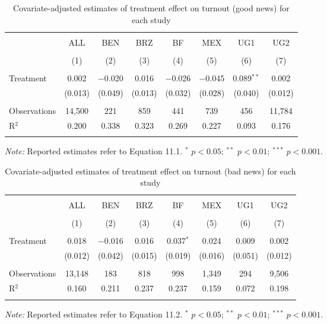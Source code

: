 \documentclass[]{article}
\begin{document}
\begin{table}[htb] \centering 
  \caption{Covariate-adjusted estimates of treatment effect on turnout (good news) for each study} 
  \label{} 
\begin{tabular}{@{\extracolsep{1pt}}lccccccc} 
\\[-1.8ex]\hline 
\hline \\[-1.8ex] 
 & ALL & BEN & BRZ & BF & MEX & UG1 & UG2 \\ 
\\[-1.8ex] & (1) & (2) & (3) & (4) & (5) & (6) & (7)\\ 
\hline \\[-1.8ex] 
 Treatment & 0.002 & $-$0.020 & 0.016 & $-$0.026 & $-$0.045 & 0.089$^{**}$ & 0.002 \\ 
  & (0.013) & (0.049) & (0.013) & (0.032) & (0.028) & (0.040) & (0.012) \\ 
\hline \\[-1.8ex] 
Observations & 14,500 & 221 & 859 & 441 & 739 & 456 & 11,784 \\ 
R$^{2}$ & 0.200 & 0.338 & 0.323 & 0.269 & 0.227 & 0.093 & 0.176 \\ 
\hline 
\hline \\[-1.8ex] 
\end{tabular} 
\begin{flushleft}\textit{Note:} Reported estimates refer to Equation 11.1. $^*$ $p<0.05$; $^{**}$ $p<0.01$; $^{***}$ $p<0.001$. \end{flushleft}
\end{table}

\begin{table}[htb] \centering 
  \caption{Covariate-adjusted estimates of treatment effect on turnout (bad news) for each study} 
  \label{} 
\begin{tabular}{@{\extracolsep{1pt}}lccccccc} 
\\[-1.8ex]\hline 
\hline \\[-1.8ex] 
 & ALL & BEN & BRZ & BF & MEX & UG1 & UG2 \\ 
\\[-1.8ex] & (1) & (2) & (3) & (4) & (5) & (6) & (7)\\ 
\hline \\[-1.8ex] 
 Treatment & 0.018 & $-$0.016 & 0.016 & 0.037$^{*}$ & 0.024 & 0.009 & 0.002 \\ 
  & (0.012) & (0.042) & (0.015) & (0.019) & (0.016) & (0.051) & (0.012) \\ 
\hline \\[-1.8ex] 
Observations & 13,148 & 183 & 818 & 998 & 1,349 & 294 & 9,506 \\ 
R$^{2}$ & 0.160 & 0.211 & 0.237 & 0.237 & 0.159 & 0.072 & 0.198 \\ 
\hline 
\hline \\[-1.8ex] 
\end{tabular} 
\begin{flushleft}\textit{Note:} Reported estimates refer to Equation 11.2. $^*$ $p<0.05$; $^{**}$ $p<0.01$; $^{***}$ $p<0.001$. \end{flushleft}
\end{table}
\end{document}
